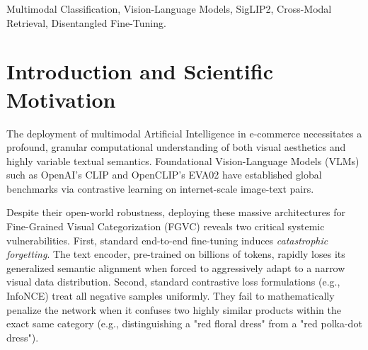 \documentclass[conference]{IEEEtran}
\begin{document}
\begin{abstract}
While large-scale Vision-Language Models (VLMs) exhibit extraordinary zero-shot generalization, fine-tuning them on granular domains like e-commerce fashion frequently induces catastrophic forgetting and representation collapse. In this extended abstract, we present FashionVLM, a mathematically optimized framework utilizing the SigLIP2 architecture. We propose two primary scientific contributions: (1) an asymmetric Disentangled Learning Rate strategy that mathematically restricts textual representation drift, preventing the degradation of foundational linguistic knowledge; and (2) a Category-Aware Hard-Negative Sigmoid Loss that applies a dynamic penalty to intra-category pairs, enforcing fine-grained visual discrimination. Empirical evaluations on a 4,337-sample multimodal corpus demonstrate that our $\sim$150M parameter framework achieves a State-of-the-Art 41.11\% Within-Category R@1. This methodology comprehensively outperforms massive foundational models (ViT-L/14, EVA02-L/14) while drastically reducing computational overhead.
\end{abstract}

\begin{IEEEkeywords}
Multimodal Classification, Vision-Language Models, SigLIP2, Cross-Modal Retrieval, Disentangled Fine-Tuning.
\end{IEEEkeywords}

\section{Introduction and Scientific Motivation}
The deployment of multimodal Artificial Intelligence in e-commerce necessitates a profound, granular computational understanding of both visual aesthetics and highly variable textual semantics. Foundational Vision-Language Models (VLMs) such as OpenAI's CLIP \cite{radford2021learning} and OpenCLIP's EVA02 \cite{fang2023eva} have established global benchmarks via contrastive learning on internet-scale image-text pairs. 

Despite their open-world robustness, deploying these massive architectures for Fine-Grained Visual Categorization (FGVC) reveals two critical systemic vulnerabilities. First, standard end-to-end fine-tuning induces \textit{catastrophic forgetting}. The text encoder, pre-trained on billions of tokens, rapidly loses its generalized semantic alignment when forced to aggressively adapt to a narrow visual data distribution. Second, standard contrastive loss formulations (e.g., InfoNCE) treat all negative samples uniformly. They fail to mathematically penalize the network when it confuses two highly similar products within the exact same category (e.g., distinguishing a "red floral dress" from a "red polka-dot dress").
\end{document}

